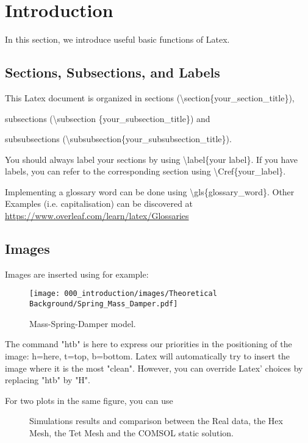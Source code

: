 \chapter{Introduction}\label{introduction}


In this section, we introduce useful basic functions of Latex. 

\section{Sections, Subsections, and Labels}\label{sections_subsections_labels}

This Latex document is organized in sections (\textbackslash section\{your\_section\_title\}), 

subsections (\textbackslash subsection \{your\_subsection\_title\}) and 

subsubsections (\textbackslash subsubsection\{your\_subsubsection\_title\}).

You should always label your sections by using \textbackslash label\{your label\}. If you have labels, you can refer to the corresponding section using \textbackslash Cref\{your\_label\}.

Implementing a glossary word can be done using \textbackslash gls\{glossary\_word\}. Other Examples (i.e. capitalisation) can be discovered at \url{https://www.overleaf.com/learn/latex/Glossaries}
\section{Images}\label{images}

Images are inserted using for example:

\begin{figure}[htb]
    \centering
    \texttt{[image: 000\_introduction/images/Theoretical Background/Spring\_Mass\_Damper.pdf]}
    \caption{Mass-Spring-Damper model.}
    \label{fig:mass_spring_damper}
\end{figure}

The command "htb" is here to express our priorities in the positioning of the image: h=here, t=top, b=bottom. Latex will automatically try to insert the image where it is the most "clean". However, you can override Latex' choices by replacing "htb" by "H".

For two plots in the same figure, you can use

\begin{figure}[htb]%
    \centering
    \qquad
    \caption{Simulations results and comparison between the Real data, the Hex Mesh, the Tet Mesh and the COMSOL static solution.}%
    \label{fig:gravity_left}%
\end{figure}

